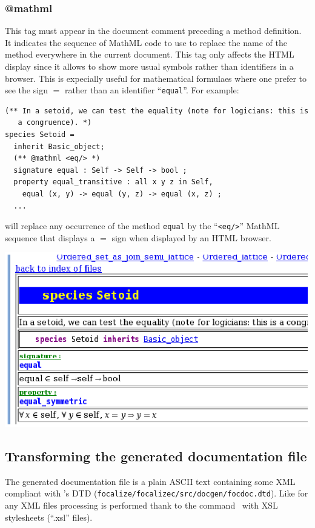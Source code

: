 \subsubsection{@mathml}
This tag must appear in the document comment preceding a method
definition. It indicates the sequence of MathML code to use to replace
the name of the method everywhere in the current document. This tag
only affects the HTML display since it allows to show more usual
symbols rather than identifiers in a browser. This is expecially
useful for mathematical formulaes where one prefer to see the sign $=$
rather than an identifier ``{\tt equal}''. For example:

{\scriptsize
\begin{lstlisting}
(** In a setoid, we can test the equality (note for logicians: this is
   a congruence). *)
species Setoid =
  inherit Basic_object;
  (** @mathml <eq/> *)
  signature equal : Self -> Self -> bool ;
  property equal_transitive : all x y z in Self,
    equal (x, y) -> equal (y, z) -> equal (x, z) ;
  ...
\end{lstlisting}}

\noindent will replace any occurrence of the method {\tt equal} by the
``\verb+<eq/>+'' MathML sequence that displays a $=$ sign when
displayed by an HTML browser.

\medskip
\includegraphics{mathml_snapshot.ps}



\subsection{Transforming the generated documentation file}
The generated documentation file is a plain ASCII text containing some
XML compliant with {\focal}'s DTD
({\tt focalize/focalizec/src/docgen/focdoc.dtd}). Like for any XML
files processing is performed thank to the command \xsltproc\ with
XSL stylesheets (``.xsl'' files).

